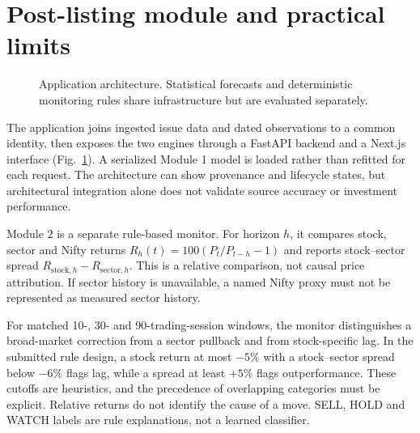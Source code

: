 \documentclass[runningheads]{llncs}
\begin{document}
\section{Post-listing module and practical limits}
\begin{figure}[tb]
\centering
{}
\caption{Application architecture. Statistical forecasts and deterministic monitoring rules share infrastructure but are evaluated separately.}
\label{fig:architecture}
\end{figure}
The application joins ingested issue data and dated observations to a common identity, then exposes the two engines through a FastAPI backend and a Next.js interface (Fig.~\ref{fig:architecture}). A serialized Module 1 model is loaded rather than refitted for each request. The architecture can show provenance and lifecycle states, but architectural integration alone does not validate source accuracy or investment performance.

Module 2 is a separate rule-based monitor. For horizon $h$, it compares stock, sector and Nifty returns $R_h(t)=100(P_t/P_{t-h}-1)$ and reports stock--sector spread $R_{\mathrm{stock},h}-R_{\mathrm{sector},h}$. This is a relative comparison, not causal price attribution. If sector history is unavailable, a named Nifty proxy must not be represented as measured sector history.

For matched 10-, 30- and 90-trading-session windows, the monitor distinguishes a broad-market correction from a sector pullback and from stock-specific lag. In the submitted rule design, a stock return at most $-5\%$ with a stock--sector spread below $-6\%$ flags lag, while a spread at least $+5\%$ flags outperformance. These cutoffs are heuristics, and the precedence of overlapping categories must be explicit. Relative returns do not identify the cause of a move. SELL, HOLD and WATCH labels are rule explanations, not a learned classifier.
\end{document}
